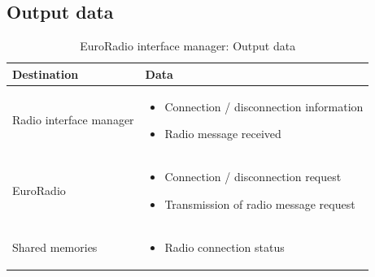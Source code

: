 \documentclass[nocc]{template/openetcs_report}
\begin{document}
\subsection{Output data}
			\begin{longtable}{|l|l|}
				\caption{EuroRadio interface manager: Output data}\\ 
				\hline
				
					\begin{minipage}[t]{0.35\linewidth} \textbf{Destination}	\end{minipage} 
				&	\begin{minipage}[t]{0.65\linewidth} \textbf{Data} \end{minipage} \\
				
				\hline
																																									
					\begin{minipage}[t]{0.35\linewidth} Radio interface manager	\end{minipage} 
				&	\begin{minipage}[t]{0.65\linewidth}
						\begin{itemize}
							\item Connection / disconnection information
							\item Radio message received
						\end{itemize}
					\end{minipage} \\
				
				\hline
				
					\begin{minipage}[t]{0.35\linewidth} EuroRadio	\end{minipage} 
				&	\begin{minipage}[t]{0.65\linewidth}
						\begin{itemize}
							\item Connection / disconnection request
							\item Transmission of radio message request
						\end{itemize}			
					\end{minipage} \\
				
				\hline	
				
					\begin{minipage}[t]{0.35\linewidth} Shared memories	\end{minipage} 
				&	\begin{minipage}[t]{0.65\linewidth}
						\begin{itemize}
							\item Radio connection status
						\end{itemize}				
					\end{minipage} \\
				
				\hline	
			\end{longtable}
\newpage				
\end{document}
